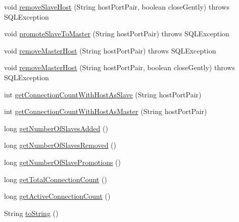 \begin{DoxyCompactItemize}
\item 
void \mbox{\hyperlink{classcom_1_1mysql_1_1cj_1_1jdbc_1_1ha_1_1_replication_connection_group_a9aa1953764777765fa5c2b58498534a1}{remove\+Slave\+Host}} (String host\+Port\+Pair, boolean close\+Gently)  throws S\+Q\+L\+Exception 
\item 
void \mbox{\hyperlink{classcom_1_1mysql_1_1cj_1_1jdbc_1_1ha_1_1_replication_connection_group_a15c7ea25c34ea77f3dedaa68eb05075d}{promote\+Slave\+To\+Master}} (String host\+Port\+Pair)  throws S\+Q\+L\+Exception 
\item 
void \mbox{\hyperlink{classcom_1_1mysql_1_1cj_1_1jdbc_1_1ha_1_1_replication_connection_group_a89849560352e7621bd8133af1af0dd3e}{remove\+Master\+Host}} (String host\+Port\+Pair)  throws S\+Q\+L\+Exception 
\item 
void \mbox{\hyperlink{classcom_1_1mysql_1_1cj_1_1jdbc_1_1ha_1_1_replication_connection_group_a63d001e066840fdb7b35f01464baedb0}{remove\+Master\+Host}} (String host\+Port\+Pair, boolean close\+Gently)  throws S\+Q\+L\+Exception 
\item 
int \mbox{\hyperlink{classcom_1_1mysql_1_1cj_1_1jdbc_1_1ha_1_1_replication_connection_group_ac128b6e69705e82273438c8fac8a5a45}{get\+Connection\+Count\+With\+Host\+As\+Slave}} (String host\+Port\+Pair)
\item 
int \mbox{\hyperlink{classcom_1_1mysql_1_1cj_1_1jdbc_1_1ha_1_1_replication_connection_group_a87f8a90ba0fad1cf31cf8e851806c01e}{get\+Connection\+Count\+With\+Host\+As\+Master}} (String host\+Port\+Pair)
\item 
long \mbox{\hyperlink{classcom_1_1mysql_1_1cj_1_1jdbc_1_1ha_1_1_replication_connection_group_aa2e94384131bb462e1f584f47236021e}{get\+Number\+Of\+Slaves\+Added}} ()
\item 
long \mbox{\hyperlink{classcom_1_1mysql_1_1cj_1_1jdbc_1_1ha_1_1_replication_connection_group_a9da050e4008ba4c847cb1942e7f5cca5}{get\+Number\+Of\+Slaves\+Removed}} ()
\item 
long \mbox{\hyperlink{classcom_1_1mysql_1_1cj_1_1jdbc_1_1ha_1_1_replication_connection_group_a831e025a67948ae07cbb2c1d8069dc64}{get\+Number\+Of\+Slave\+Promotions}} ()
\item 
long \mbox{\hyperlink{classcom_1_1mysql_1_1cj_1_1jdbc_1_1ha_1_1_replication_connection_group_a41e58a0d89cfb66483e04def035144ff}{get\+Total\+Connection\+Count}} ()
\item 
long \mbox{\hyperlink{classcom_1_1mysql_1_1cj_1_1jdbc_1_1ha_1_1_replication_connection_group_a0688494ae0d8db6dade2ab0012c32c8b}{get\+Active\+Connection\+Count}} ()
\item 
String \mbox{\hyperlink{classcom_1_1mysql_1_1cj_1_1jdbc_1_1ha_1_1_replication_connection_group_a3acb730154c5ca1be9bef539ac44d4ed}{to\+String}} ()
\end{DoxyCompactItemize}



